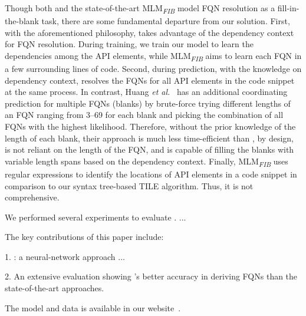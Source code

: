 Though both \tool and the state-of-the-art
MLM\textsubscript{\textit{FIB}} model FQN resolution as a
fill-in-the-blank task, there are some fundamental departure from our
solution. First, with the aforementioned philosophy, {\tool} takes
advantage of the dependency context for FQN resolution. During
training, we train our model to learn the dependencies among the API
elements, while MLM\textsubscript{\textit{FIB}} aims to learn each FQN
in a few surrounding lines of code. Second, during prediction, with
the knowledge on dependency context, {\tool} resolves the FQNs for all
API elements in the code snippet at the same process.  In contrast,
Huang {\em et al.}~\cite{prompt-ase22} has an additional coordinating
prediction for multiple FQNs (blanks) by brute-force trying different
lengths of an FQN ranging from 3--69 for each blank and picking the
combination of all FQNs with the highest likelihood. Therefore,
without the prior knowledge of the length of each blank, their
approach is much less time-efficient than {\tool}, by design, is not
reliant on the length of the FQN, and is capable of filling the blanks
with variable length spans based on the dependency context. Finally,
MLM\textsubscript{\textit{FIB}} uses regular expressions to identify
the locations of API elements in a code snippet in comparison to our
syntax tree-based TILE algorithm. Thus, it is not comprehensive.





We performed several experiments to evaluate {\tool}. ...

The key contributions of this paper include:

1. {\tool}: a neural-network approach ...

2. An extensive evaluation showing {\tool}'s better accuracy in
deriving FQNs than the state-of-the-art approaches.

The model and data is available in our website~\cite{deepFQN-website}.
